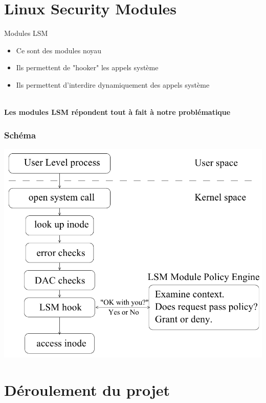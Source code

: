 \documentclass{beamer}
\begin{document}
\section{Linux Security Modules}
\begin{frame}{Modules LSM}
	\begin{itemize}
		\item Ce sont des modules noyau
		\item Ils permettent de "hooker" les appels système
		\item Ils permettent d'interdire dynamiquement des appels système
	\end{itemize}
~\\	
\textbf{Les modules LSM répondent tout à fait à notre problématique}
\end{frame}

\begin{frame}
\frametitle{Schéma}
\begin{center}
	\includegraphics[scale=0.30]{attachements/lsm1.png}
\end{center}
\end{frame}


\section{Déroulement du projet}
\end{document}
